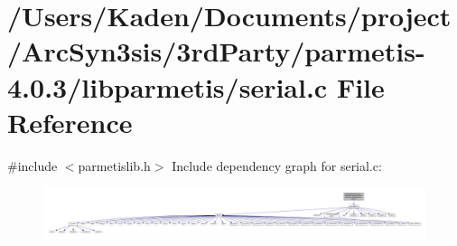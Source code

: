 \hypertarget{a00407}{}\section{/\+Users/\+Kaden/\+Documents/project/\+Arc\+Syn3sis/3rd\+Party/parmetis-\/4.0.3/libparmetis/serial.c File Reference}
\label{a00407}
{\ttfamily \#include $<$parmetislib.\+h$>$}\newline
Include dependency graph for serial.\+c\+:\nopagebreak
\begin{figure}[H]
\begin{center}
\leavevmode
\includegraphics[width=350pt]{a00408}
\end{center}
\end{figure}
